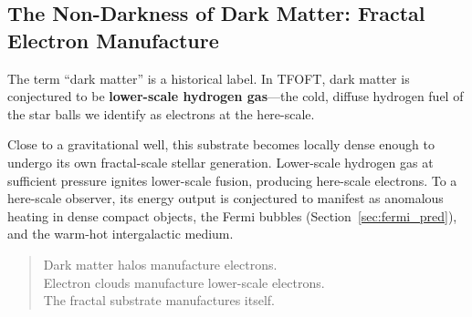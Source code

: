 \documentclass[11pt,a4paper]{article}
\begin{document}
\subsection{The Non-Darkness of Dark Matter: Fractal Electron Manufacture}

The term ``dark matter'' is a historical label. In TFOFT, dark matter is conjectured to be \textbf{lower-scale hydrogen gas}---the cold, diffuse hydrogen fuel of the star balls we identify as electrons at the here-scale.

Close to a gravitational well, this substrate becomes locally dense enough to undergo its own fractal-scale stellar generation. Lower-scale hydrogen gas at sufficient pressure ignites lower-scale fusion, producing here-scale electrons. To a here-scale observer, its energy output is conjectured to manifest as anomalous heating in dense compact objects, the Fermi bubbles (Section~\ref{sec:fermi_pred}), and the warm-hot intergalactic medium.

\begin{quote}
Dark matter halos manufacture electrons. \\
Electron clouds manufacture lower-scale electrons. \\
The fractal substrate manufactures itself.
\end{quote}
\end{document}
